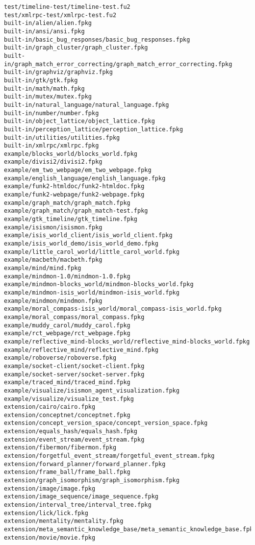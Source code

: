 \begin{lstlisting}
test/timeline-test/timeline-test.fu2
test/xmlrpc-test/xmlrpc-test.fu2
built-in/alien/alien.fpkg
built-in/ansi/ansi.fpkg
built-in/basic_bug_responses/basic_bug_responses.fpkg
built-in/graph_cluster/graph_cluster.fpkg
built-in/graph_match_error_correcting/graph_match_error_correcting.fpkg
built-in/graphviz/graphviz.fpkg
built-in/gtk/gtk.fpkg
built-in/math/math.fpkg
built-in/mutex/mutex.fpkg
built-in/natural_language/natural_language.fpkg
built-in/number/number.fpkg
built-in/object_lattice/object_lattice.fpkg
built-in/perception_lattice/perception_lattice.fpkg
built-in/utilities/utilities.fpkg
built-in/xmlrpc/xmlrpc.fpkg
example/blocks_world/blocks_world.fpkg
example/divisi2/divisi2.fpkg
example/em_two_webpage/em_two_webpage.fpkg
example/english_language/english_language.fpkg
example/funk2-htmldoc/funk2-htmldoc.fpkg
example/funk2-webpage/funk2-webpage.fpkg
example/graph_match/graph_match.fpkg
example/graph_match/graph_match-test.fpkg
example/gtk_timeline/gtk_timeline.fpkg
example/isismon/isismon.fpkg
example/isis_world_client/isis_world_client.fpkg
example/isis_world_demo/isis_world_demo.fpkg
example/little_carol_world/little_carol_world.fpkg
example/macbeth/macbeth.fpkg
example/mind/mind.fpkg
example/mindmon-1.0/mindmon-1.0.fpkg
example/mindmon-blocks_world/mindmon-blocks_world.fpkg
example/mindmon-isis_world/mindmon-isis_world.fpkg
example/mindmon/mindmon.fpkg
example/moral_compass-isis_world/moral_compass-isis_world.fpkg
example/moral_compass/moral_compass.fpkg
example/muddy_carol/muddy_carol.fpkg
example/rct_webpage/rct_webpage.fpkg
example/reflective_mind-blocks_world/reflective_mind-blocks_world.fpkg
example/reflective_mind/reflective_mind.fpkg
example/roboverse/roboverse.fpkg
example/socket-client/socket-client.fpkg
example/socket-server/socket-server.fpkg
example/traced_mind/traced_mind.fpkg
example/visualize/isismon_agent_visualization.fpkg
example/visualize/visualize_test.fpkg
extension/cairo/cairo.fpkg
extension/conceptnet/conceptnet.fpkg
extension/concept_version_space/concept_version_space.fpkg
extension/equals_hash/equals_hash.fpkg
extension/event_stream/event_stream.fpkg
extension/fibermon/fibermon.fpkg
extension/forgetful_event_stream/forgetful_event_stream.fpkg
extension/forward_planner/forward_planner.fpkg
extension/frame_ball/frame_ball.fpkg
extension/graph_isomorphism/graph_isomorphism.fpkg
extension/image/image.fpkg
extension/image_sequence/image_sequence.fpkg
extension/interval_tree/interval_tree.fpkg
extension/lick/lick.fpkg
extension/mentality/mentality.fpkg
extension/meta_semantic_knowledge_base/meta_semantic_knowledge_base.fpkg
extension/movie/movie.fpkg

\end{lstlisting}
